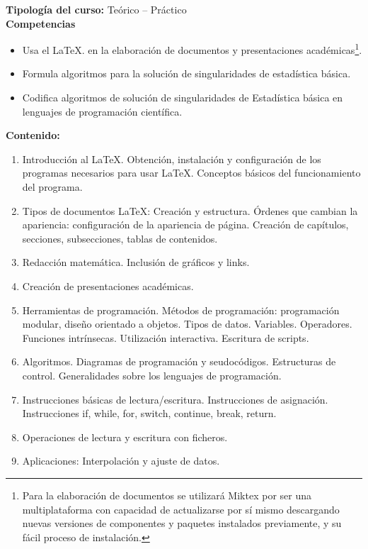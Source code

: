 \documentclass[12pt,a4paper]{article}
\begin{document}
\textbf{Tipología del curso:} Teórico – Práctico \\

\textbf{Competencias}
\begin{itemize}
\item Usa el \LaTeX. en la elaboración de documentos y presentaciones académicas\footnote{Para la elaboración de documentos se utilizará Miktex por ser una multiplataforma con capacidad de actualizarse por sí mismo descargando nuevas versiones de componentes y paquetes instalados previamente, y su fácil proceso de instalación.}.
\item Formula algoritmos para la solución de singularidades de estadística básica.
\item Codifica algoritmos de solución de singularidades de Estadística básica en lenguajes de programación científica.
\end{itemize} 

\textbf{Contenido:}
\begin{enumerate}
\item Introducción al \LaTeX. Obtención, instalación y configuración de los programas necesarios para usar \LaTeX. Conceptos básicos del funcionamiento del programa.
\item Tipos de documentos \LaTeX: Creación y estructura. Órdenes que cambian la apariencia: configuración de la apariencia de página. Creación de capítulos, secciones, subsecciones, tablas de contenidos.
\item Redacción matemática. Inclusión de gráficos y links.
\item Creación de presentaciones académicas.
\item Herramientas de programación. Métodos de programación: programación modular, diseño orientado a objetos. Tipos de datos. Variables. Operadores. Funciones intrínsecas. Utilización interactiva. Escritura de scripts.
\item Algoritmos. Diagramas de programación y seudocódigos. Estructuras de control. Generalidades sobre los lenguajes de programación.
\item Instrucciones básicas de lectura/escritura. Instrucciones de asignación. Instrucciones if, while, for, switch, continue, break, return.
\item Operaciones de lectura  y escritura con ficheros.
\item Aplicaciones: Interpolación y ajuste de datos. 
\end{enumerate}

\end{document}
